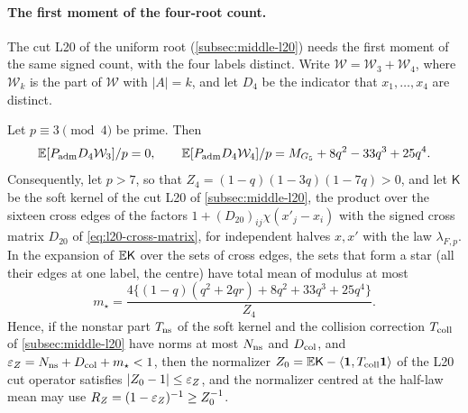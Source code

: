 \paragraph{The first moment of the four-root count.}
The cut L20 of the uniform root (\cref{subsec:middle-l20}) needs the first
moment of the same signed count, with the four labels distinct. Write
$\mathcal W=\mathcal W_3+\mathcal W_4$, where $\mathcal W_k$ is the part of
$\mathcal W$ with $|A|=k$, and let $D_4$ be the indicator that $x_1,\dots,x_4$
are distinct.

\begin{lemma}\label{lem:l20-star-mean}
Let $p\equiv3\pmod4$ be prime. Then
\begin{equation}\label{eq:l20-star-identities}
 \mathbb E[P_{\rm adm}D_4\mathcal W_3]/p=0,\qquad
 \mathbb E[P_{\rm adm}D_4\mathcal W_4]/p=M_{G_5}+8q^2-33q^3+25q^4 .
\end{equation}
Consequently, let $p>7$, so that $Z_4=(1-q)(1-3q)(1-7q)>0$, and let $\mathsf K$
be the soft kernel of the cut L20 of \cref{subsec:middle-l20}, the product over
the sixteen cross edges of the factors $1+(D_{20})_{ij}\chi(x'_j-x_i)$ with the
signed cross matrix $D_{20}$ of \eqref{eq:l20-cross-matrix}, for independent
halves $x,x'$ with the law $\lambda_{F,p}$. In the expansion of $\mathbb E\mathsf K$ over
the sets of cross edges, the sets that form a star (all their edges at one
label, the centre) have total mean of modulus at most
\[
 m_\star=\frac{4\{(1-q)(q^2+2qr)+8q^2+33q^3+25q^4\}}{Z_4}.
\]
Hence, if the nonstar part $T_{\rm ns}$ of the soft kernel and the collision
correction $T_{\rm coll}$ of \cref{subsec:middle-l20} have norms at most
$N_{\rm ns}$ and $D_{\rm col}$, and $\varepsilon_Z=N_{\rm ns}+D_{\rm col}+m_\star<1$, then
the normalizer $Z_0=\mathbb E\mathsf K-\left\langle \mathbf 1,T_{\rm coll}\mathbf 1\right\rangle$ of the L20 cut operator
satisfies $|Z_0-1|\le\varepsilon_Z$, and the normalizer centred at the half-law mean may use
$R_Z=(1-\varepsilon_Z)^{-1}\ge Z_0^{-1}$.
\end{lemma}

